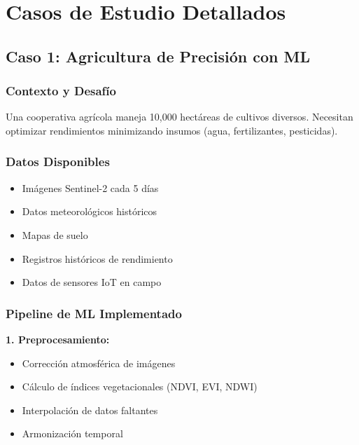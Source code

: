 \documentclass[12pt,a4paper]{article}
\begin{document}
\section{Casos de Estudio Detallados}

\subsection{Caso 1: Agricultura de Precisión con ML}

\subsubsection{Contexto y Desafío}

Una cooperativa agrícola maneja 10,000 hectáreas de cultivos diversos. Necesitan optimizar rendimientos minimizando insumos (agua, fertilizantes, pesticidas).

\subsubsection{Datos Disponibles}

\begin{itemize}
    \item Imágenes Sentinel-2 cada 5 días
    \item Datos meteorológicos históricos
    \item Mapas de suelo
    \item Registros históricos de rendimiento
    \item Datos de sensores IoT en campo
\end{itemize}

\subsubsection{Pipeline de ML Implementado}

\textbf{1. Preprocesamiento:}
\begin{itemize}
    \item Corrección atmosférica de imágenes
    \item Cálculo de índices vegetacionales (NDVI, EVI, NDWI)
    \item Interpolación de datos faltantes
    \item Armonización temporal
\end{itemize}
\end{document}
